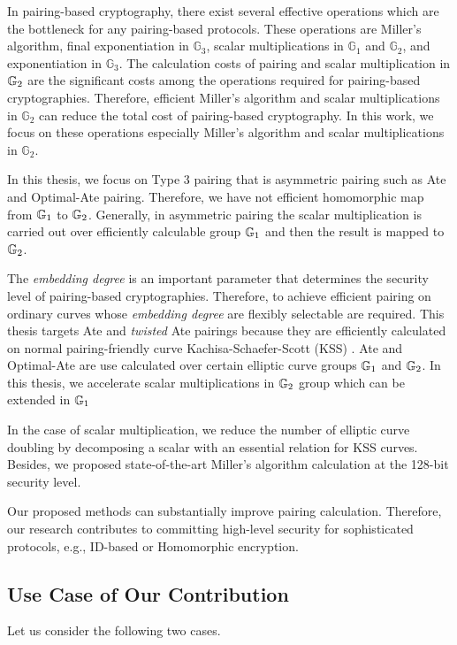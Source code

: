 In pairing-based cryptography, there exist several effective operations which are the bottleneck for any pairing-based protocols.
These operations are Miller's algorithm, final exponentiation in $\mathbb{G}_3$, scalar multiplications in $\mathbb{G}_1$ and $\mathbb{G}_2$, and exponentiation in $\mathbb{G}_3$.
The calculation costs of pairing and scalar multiplication in ${\mathbb{G}}_{2}$ are the significant costs among the operations required for pairing-based cryptographies.
Therefore, efficient Miller's algorithm and scalar multiplications in $\mathbb{G}_2$ can reduce the total cost of pairing-based cryptography.
In this work, we focus on these operations especially Miller's algorithm and scalar multiplications in $\mathbb{G}_2$.

In this thesis, we focus on Type 3 pairing that is asymmetric pairing such as Ate \cite{EPRINT:MKHO07} and Optimal-Ate \cite{DBLP:journals/tit/Vercauteren10} pairing.
Therefore, we have not efficient homomorphic map from ${\mathbb{G}}_{1}$ to ${\mathbb{G}}_{2}$. 
Generally, in asymmetric pairing the scalar multiplication is carried out over efficiently calculable group ${\mathbb{G}}_{1}$ and then the result is mapped to ${\mathbb{G}}_{2}$.

The {\it embedding degree} is an important parameter that determines the security level of pairing-based cryptographies.
Therefore, to achieve efficient pairing on ordinary curves whose {\it embedding degree} are flexibly selectable are required.
This thesis targets Ate and {\it twisted} Ate pairings because they are efficiently calculated on normal pairing-friendly curve Kachisa-Schaefer-Scott (KSS) \cite{EPRINT:KacSchSco07}.
Ate and Optimal-Ate are use calculated over certain elliptic curve groups ${\mathbb{G}}_{1}$ and ${\mathbb{G}}_{2}$.
In this thesis, we accelerate scalar multiplications in ${\mathbb{G}}_{2}$ group which can be extended in ${\mathbb{G}}_{1}$

In the case of scalar multiplication, we reduce the number of elliptic curve doubling by decomposing a scalar with an essential relation for KSS curves.
Besides, we proposed state-of-the-art Miller's algorithm calculation at the 128-bit security level.

Our proposed methods can substantially improve pairing calculation.
Therefore, our research contributes to committing high-level security for sophisticated protocols, e.g., ID-based or Homomorphic encryption.

\subsection*{Use Case of Our Contribution}
Let us consider the following two cases.
\label{ch1_sec_motivation}



